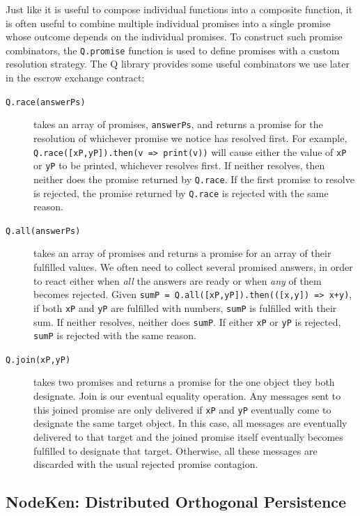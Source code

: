\documentclass{llncs}
\begin{document}
Just like it is useful to compose individual functions into a composite function, it is often useful to combine multiple individual promises into a single promise whose outcome depends on the individual promises. To construct such promise combinators, the {\tt Q.promise} function is used to define promises with a custom resolution strategy. The Q library provides some useful combinators we use later in the escrow exchange contract:

\begin{description}
\item[{\tt Q.race(answerPs)}] takes an array of promises, {\tt answerPs}, and returns a promise for the resolution of whichever promise we notice has resolved first. For example, {\tt Q.race([xP,yP]).then(v => print(v))} will cause either the value of {\tt xP} or {\tt yP} to be printed, whichever resolves first. If neither resolves, then neither does the promise returned by {\tt Q.race}. If the first promise to resolve is rejected, the promise returned by {\tt Q.race} is rejected with the same reason.

\item[{\tt Q.all(answerPs)}] takes an array of promises and returns a promise for an array of their fulfilled values. We often need to collect several promised answers, in order to react either when \emph{all} the answers are ready or when \emph{any} of them becomes rejected. Given {\tt sumP = Q.all([xP,yP]).then(([x,y]) => x+y)}, if both {\tt xP} and {\tt yP} are fulfilled with numbers, {\tt sumP} is fulfilled with their sum. If neither resolves, neither does {\tt sumP}. If either {\tt xP} or {\tt yP} is rejected, {\tt sumP} is rejected with the same reason.

\item[{\tt Q.join(xP,yP)}] takes two promises and returns a promise for the one object they both designate. Join is our eventual equality operation. Any messages sent to this joined promise are only delivered if {\tt xP} and {\tt yP} eventually come to designate the same target object. In this case, all messages are eventually delivered to that target and the joined promise itself eventually becomes fulfilled to designate that target. Otherwise, all these messages are discarded with the usual rejected promise contagion.
\end{description}


\subsection{NodeKen: Distributed Orthogonal Persistence}
\end{document}
